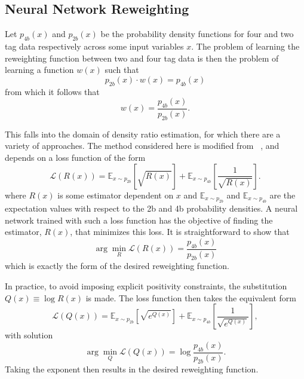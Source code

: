 \subsection{Neural Network Reweighting}
Let $p_{4b}(x)$ and $p_{2b}(x)$ be the probability density functions for four and two tag data respectively across 
some input variables $x$. The problem of learning the reweighting function between two and four tag data 
is then the problem of learning a function $w(x)$ such that
\begin{equation}
p_{2b}(x) \cdot w(x) = p_{4b}(x)
\end{equation}
from which it follows that
\begin{equation}
w(x) = \frac{p_{4b}(x)}{p_{2b}(x)}.
\end{equation}

This falls into the domain of density ratio estimation, for which there are a variety
of approaches. The method considered here is modified from ~\cite{NNloss, NNloss1}, and depends on
a loss function of the form
\begin{equation}
\mathcal{L}(R(x)) = \mathbb{E}_{x\sim p_{2b}}[\sqrt{R(x)}]
+\mathbb{E}_{x\sim p_{4b}}[\frac{1}{\sqrt{R(x)}}].
\end{equation}
where $R(x)$ is some estimator dependent on $x$ and $\mathbb{E}_{x\sim p_{2b}}$ and 
$\mathbb{E}_{x\sim p_{4b}}$ are the expectation values with respect to the 2b and 4b probability 
densities. A neural network trained with such a loss function has the objective of finding
the estimator, $R(x)$, that minimizes this loss. It is straightforward to show that
\begin{equation}
\arg \min_{R}\mathcal{L}(R(x)) = \frac{p_{4b}(x)}{p_{2b}(x)}
\end{equation}
which is exactly the form of the desired reweighting function.

In practice, to avoid imposing explicit positivity constraints, the substitution
$Q(x) \equiv \log R(x)$ is made. The loss function then takes the equivalent form
\begin{equation}
\mathcal{L}(Q(x)) = \mathbb{E}_{x\sim p_{2b}}[\sqrt{e^{Q(x)}}]
+\mathbb{E}_{x\sim p_{4b}}[\frac{1}{\sqrt{e^{Q(x)}}}],
\end{equation}
with solution
\begin{equation}
\arg \min_{Q}\mathcal{L}(Q(x)) = \log\frac{p_{4b}(x)}{p_{2b}(x)}.
\end{equation}
Taking the exponent then results in the desired reweighting function.

